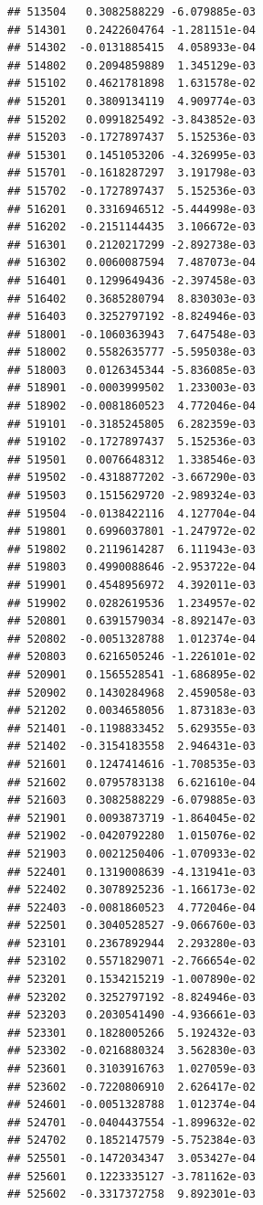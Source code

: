\begin{frame}[fragile]
\begin{verbatim}
## 513504   0.3082588229 -6.079885e-03
## 514301   0.2422604764 -1.281151e-04
## 514302  -0.0131885415  4.058933e-04
## 514802   0.2094859889  1.345129e-03
## 515102   0.4621781898  1.631578e-02
## 515201   0.3809134119  4.909774e-03
## 515202   0.0991825492 -3.843852e-03
## 515203  -0.1727897437  5.152536e-03
## 515301   0.1451053206 -4.326995e-03
## 515701  -0.1618287297  3.191798e-03
## 515702  -0.1727897437  5.152536e-03
## 516201   0.3316946512 -5.444998e-03
## 516202  -0.2151144435  3.106672e-03
## 516301   0.2120217299 -2.892738e-03
## 516302   0.0060087594  7.487073e-04
## 516401   0.1299649436 -2.397458e-03
## 516402   0.3685280794  8.830303e-03
## 516403   0.3252797192 -8.824946e-03
## 518001  -0.1060363943  7.647548e-03
## 518002   0.5582635777 -5.595038e-03
## 518003   0.0126345344 -5.836085e-03
## 518901  -0.0003999502  1.233003e-03
## 518902  -0.0081860523  4.772046e-04
## 519101  -0.3185245805  6.282359e-03
## 519102  -0.1727897437  5.152536e-03
## 519501   0.0076648312  1.338546e-03
## 519502  -0.4318877202 -3.667290e-03
## 519503   0.1515629720 -2.989324e-03
## 519504  -0.0138422116  4.127704e-04
## 519801   0.6996037801 -1.247972e-02
## 519802   0.2119614287  6.111943e-03
## 519803   0.4990088646 -2.953722e-04
## 519901   0.4548956972  4.392011e-03
## 519902   0.0282619536  1.234957e-02
## 520801   0.6391579034 -8.892147e-03
## 520802  -0.0051328788  1.012374e-04
## 520803   0.6216505246 -1.226101e-02
## 520901   0.1565528541 -1.686895e-02
## 520902   0.1430284968  2.459058e-03
## 521202   0.0034658056  1.873183e-03
## 521401  -0.1198833452  5.629355e-03
## 521402  -0.3154183558  2.946431e-03
## 521601   0.1247414616 -1.708535e-03
## 521602   0.0795783138  6.621610e-04
## 521603   0.3082588229 -6.079885e-03
## 521901   0.0093873719 -1.864045e-02
## 521902  -0.0420792280  1.015076e-02
## 521903   0.0021250406 -1.070933e-02
## 522401   0.1319008639 -4.131941e-03
## 522402   0.3078925236 -1.166173e-02
## 522403  -0.0081860523  4.772046e-04
## 522501   0.3040528527 -9.066760e-03
## 523101   0.2367892944  2.293280e-03
## 523102   0.5571829071 -2.766654e-02
## 523201   0.1534215219 -1.007890e-02
## 523202   0.3252797192 -8.824946e-03
## 523203   0.2030541490 -4.936661e-03
## 523301   0.1828005266  5.192432e-03
## 523302  -0.0216880324  3.562830e-03
## 523601   0.3103916763  1.027059e-03
## 523602  -0.7220806910  2.626417e-02
## 524601  -0.0051328788  1.012374e-04
## 524701  -0.0404437554 -1.899632e-02
## 524702   0.1852147579 -5.752384e-03
## 525501  -0.1472034347  3.053427e-04
## 525601   0.1223335127 -3.781162e-03
## 525602  -0.3317372758  9.892301e-03

\end{verbatim}
\end{frame}
